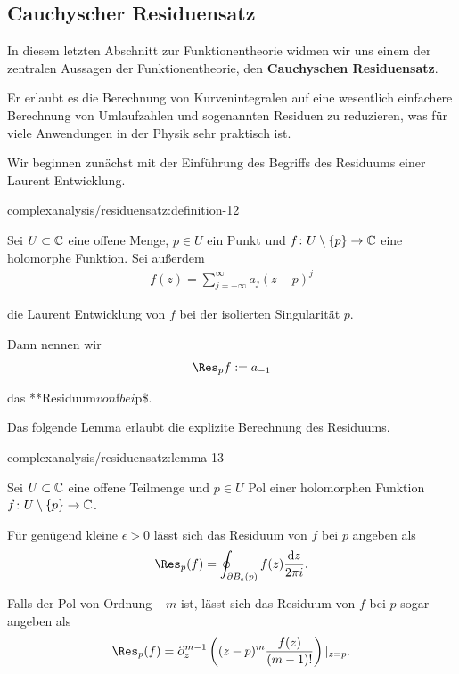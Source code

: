 \subsection{Cauchyscher Residuensatz}
\label{\detokenize{complexanalysis/residuensatz:cauchyscher-residuensatz}}
\par
In diesem letzten Abschnitt zur Funktionentheorie widmen wir uns einem der zentralen Aussagen der Funktionentheorie, den \textbf{Cauchyschen Residuensatz}.

\par
Er erlaubt es die Berechnung von Kurvenintegralen auf eine wesentlich einfachere Berechnung von Umlaufzahlen und sogenannten Residuen zu reduzieren, was für viele Anwendungen in der Physik sehr praktisch ist.

\par
Wir beginnen zunächst mit der Einführung des Begriffs des Residuums einer Laurent Entwicklung.
\begin{definition}{}{complexanalysis/residuensatz:definition-12}



\par
Sei \(U \subset \mathbb{C}\) eine offene Menge, \(p \in U\) ein Punkt und \(f \colon U \setminus \{p\} \rightarrow \mathbb{C}\) eine holomorphe Funktion.
Sei außerdem
\begin{align*}
f(z) = \sum_{j=-\infty}^\infty a_j (z-p)^j
\end{align*}
\par
die Laurent Entwicklung von \(f\) bei der isolierten Singularität \(p\).

\par
Dann nennen wir
\begin{align*}
\Res_p f := a_{-1}
\end{align*}
\par
das **Residuum\( von \)f\( bei \)p\$.
\end{definition}

\par
Das folgende Lemma erlaubt die explizite Berechnung des Residuums.
\begin{lemma}{}{complexanalysis/residuensatz:lemma-13}



\par
Sei \(U \subset \mathbb{C}\) eine offene Teilmenge und \(p \in U\) Pol einer holomorphen Funktion \(f \colon U \setminus \{p\} \rightarrow \mathbb{C}\).

\par
Für genügend kleine \(\epsilon > 0\) lässt sich das Residuum von \(f\) bei \(p\) angeben als
\begin{align*}
\Res_{p}(f) = \oint_{\partial B_\epsilon(p)} f(z) \frac{\mathrm{d}z}{2\pi i}.
\end{align*}
\par
Falls der Pol von Ordnung \(-m\) ist, lässt sich das Residuum von \(f\) bei \(p\) sogar angeben als
\begin{align*}
\Res_{p}(f) = \partial_z^{m-1}\left( (z-p)^m \frac{f(z)}{(m-1)!}\right)|_{z=p}.
\end{align*}\end{lemma}

